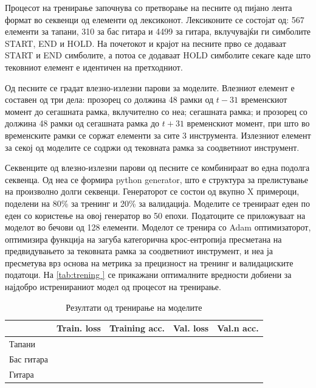 Процесот на тренирање започнува со претворање на песните од пијано лента формат во секвенци од елементи од лексиконот. Лексиконите се состојат од: 567 елементи за тапани, 310 за бас гитара и 4499 за гитара, вклучувајќи ги симболите START, END и HOLD. На почетокот и крајот на песните прво се додаваат  START и END симболите, а потоа се додаваат HOLD симболите секаге каде што тековниот елемент е идентичен на претходниот. 

Од песните се градат влезно-излезни парови за моделите. Влезниот елемент е составен од три дела: прозорец со должина 48 рамки од $t-31$ временскиот момент до сегашната рамка, вклучително со неа; сегашната рамка; и прозорец со должина 48 рамки од сегашната рамка до $t+31$ временскиот момент, при што во временските рамки се соржат елементи за сите 3 инструмента. Излезниот елемент за секој од моделите се содржи од тековната рамка за соодветниот инструмент.

Секвенците од влезно-излезни парови од песните се комбинираат во една подолга секвенца. Од неа се формира python generator, што е структура за прелистување на произволно долги секвенци. Генераторот се состои од вкупно X примероци, поделени на 80\% за тренинг и 20\% за валидација. Моделите се тренираат еден по еден со користење на овој генератор во 50 епохи. Податоците се приложуваат на моделот во бечови од 128 елементи. Моделот се тренира со Adam оптимизаторот, оптимизира функција на загуба категорична крос-ентропија пресметана на предвидувањето за тековната рамка за соодветниот инструмент, и неа ја пресметува врз основа на метрика за прецизност на тренинг и валидациските податоци. На \ref{tab:trening } се прикажани оптималните вредности добиени за најдобро истренираниот модел од процесот на тренирање.

\begin{table}[H]
\centering
\begin{tabular}{@{}lllll@{}}
\toprule
           & \multicolumn{1}{c}{Train. loss} & Training acc. & Val. loss & Val.n acc. \\ \midrule
Тапани     &                                   &                   &                 &                     \\
Бас гитара &                                   &                   &                 &                     \\
Гитара     &                                   &                   &                 &                     \\ \bottomrule
\end{tabular}
\caption{Резултати од тренирање на моделите}
\label{tab:trening}
\end{table}


